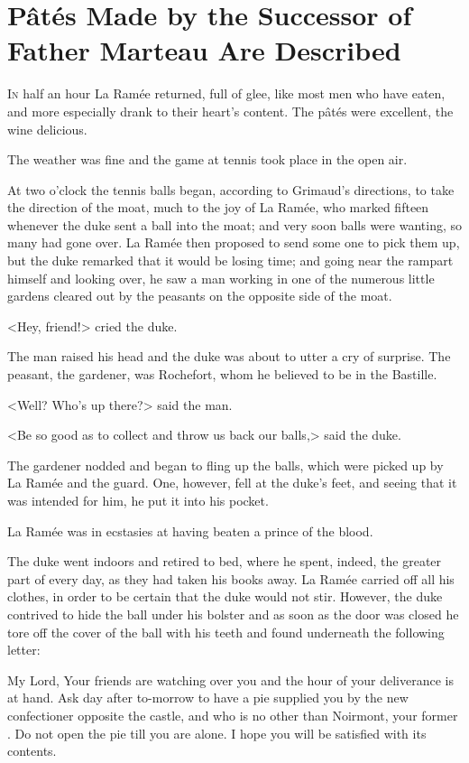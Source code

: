 \chapter{Pâtés Made by the Successor of Father Marteau Are Described}

 \lettrine{I}{n} half an hour La Ramée returned, full of glee, like most men who have eaten, and more especially drank to their heart's content. The pâtés were excellent, the wine delicious.

\zz
The weather was fine and the game at tennis took place in the open air.

At two o'clock the tennis balls began, according to Grimaud's directions, to take the direction of the moat, much to the joy of La Ramée, who marked fifteen whenever the duke sent a ball into the moat; and very soon balls were wanting, so many had gone over. La Ramée then proposed to send some one to pick them up, but the duke remarked that it would be losing time; and going near the rampart himself and looking over, he saw a man working in one of the numerous little gardens cleared out by the peasants on the opposite side of the moat.

<Hey, friend!> cried the duke.

The man raised his head and the duke was about to utter a cry of surprise. The peasant, the gardener, was Rochefort, whom he believed to be in the Bastille.

<Well? Who's up there?> said the man.

<Be so good as to collect and throw us back our balls,> said the duke.

The gardener nodded and began to fling up the balls, which were picked up by La Ramée and the guard. One, however, fell at the duke's feet, and seeing that it was intended for him, he put it into his pocket.

La Ramée was in ecstasies at having beaten a prince of the blood.

The duke went indoors and retired to bed, where he spent, indeed, the greater part of every day, as they had taken his books away. La Ramée carried off all his clothes, in order to be certain that the duke would not stir. However, the duke contrived to hide the ball under his bolster and as soon as the door was closed he tore off the cover of the ball with his teeth and found underneath the following letter: 

\begin{mail}{}{My Lord,}
Your friends are watching over you and the hour of your deliverance is at hand. Ask day after to-morrow to have a pie supplied you by the new confectioner opposite the castle, and who is no other than Noirmont, your former . Do not open the pie till you are alone. I hope you will be satisfied with its contents.  

\end{mail}

